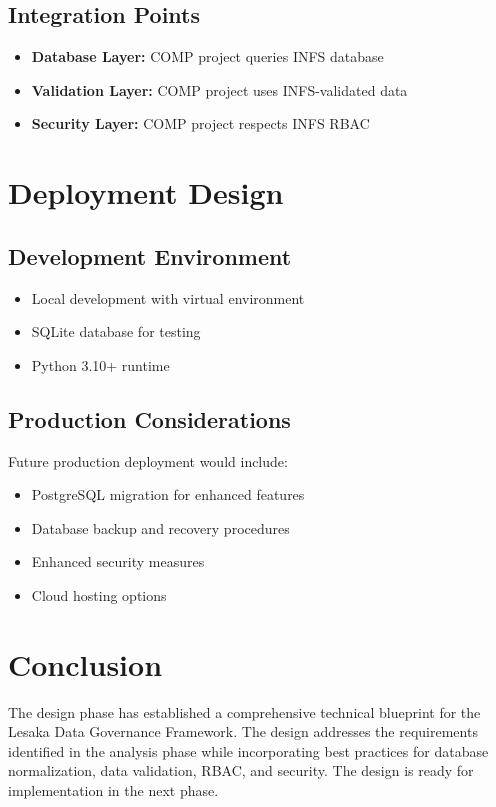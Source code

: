 \subsection{Integration Points}

\begin{itemize}
    \item \textbf{Database Layer:} COMP project queries INFS database
    \item \textbf{Validation Layer:} COMP project uses INFS-validated data
    \item \textbf{Security Layer:} COMP project respects INFS RBAC
\end{itemize}

\section{Deployment Design}

\subsection{Development Environment}

\begin{itemize}
    \item Local development with virtual environment
    \item SQLite database for testing
    \item Python 3.10+ runtime
\end{itemize}

\subsection{Production Considerations}

Future production deployment would include:

\begin{itemize}
    \item PostgreSQL migration for enhanced features
    \item Database backup and recovery procedures
    \item Enhanced security measures
    \item Cloud hosting options
\end{itemize}

\section{Conclusion}

The design phase has established a comprehensive technical blueprint for the Lesaka Data Governance Framework. The design addresses the requirements identified in the analysis phase while incorporating best practices for database normalization, data validation, RBAC, and security. The design is ready for implementation in the next phase.
